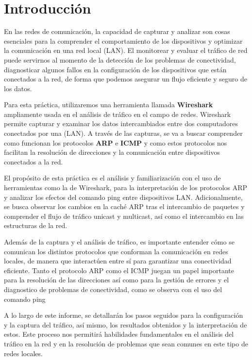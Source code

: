 \setcounter{page}{1}

\section{Introducción}
    En las redes de comunicación, la capacidad de capturar y analizar son cosas esenciales para la comprender el comportamiento de los dispositivos y optimizar la comunicación en una red local (LAN). El monitorear y evaluar el tráfico de red puede servirnos al momento de la detección de los problemas de conectividad, diagnosticar algunos fallos en la configuración de los dispositivos que están conectados a la red, de forma que podemos asegurar un flujo eficiente y seguro de los datos.

    Para esta práctica, utilizaremos una herramienta llamada \textbf{Wireshark}  ampliamente usada en el análisis de tráfico en el campo de redes. Wireshark permite capturar y examinar los datos intercambiados entre dos computadores conectados por una (LAN). A través de las capturas, se va a buscar comprender como funcionan los protocolos \textbf{ARP} e \textbf{ICMP} y como estos protocolos nos facilitan la resolución de direcciones y la comunicación entre dispositivos conectados a la red.

    El propósito de esta práctica es el análisis y familiarización con el uso de herramientas como la de Wireshark, para la interpretación de los protocolos ARP y analizar los efectos del comando ping entre dispositivos LAN. Adicionalmente, se busca observar los cambios en la caché ARP tras el intercambio de paquetes y comprender el flujo de tráfico unicast y multicast, así como el intercambio en las estructuras de la red.

    Además de la captura y el análisis de tráfico, es importante entender cómo se comunican los distintos protocolos que conforman la comunicación en redes locales, de manera que interactúen entre sí para garantizar una conectividad eficiente. Tanto el protocolo ARP como el ICMP juegan un papel importante para la resolución de las direcciones así como para la gestión de errores y el diagnostico de problemas de conectividad, como se observa con el uso del comando ping

    A lo largo de este informe, se detallarán los pasos seguidos para la configuración y la captura del tráfico, así mismo, los resultados obtenidos y la interpretación de estos. Este proceso nos permitirá habilidades fundamentales en el análisis del tráfico en la red y en la resolución de problemas que sean comunes en este tipo de redes locales.

